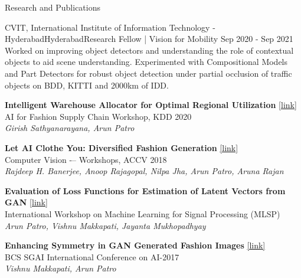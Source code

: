 \documentclass{resume} %
\begin{document}
\begin{rSection}{Research and Publications}
\begin{rSubsection}{CVIT, International Institute of Information Technology - Hyderabad}{Hyderabad}{Research Fellow | Vision for Mobility }{Sep 2020 - Sep 2021}
Worked on improving object detectors and understanding the role of contextual objects to aid scene understanding. Experimented with Compositional Models and Part Detectors for robust object detection under partial occlusion of traffic objects on BDD, KITTI and 2000km of IDD.
\end{rSubsection}

{\bf Intelligent Warehouse Allocator for Optimal Regional Utilization} \href{https://arxiv.org/abs/2007.05081}{[link]}
\\{AI for Fashion Supply Chain Workshop, KDD 2020}
\\{\it Girish Sathyanarayana, Arun Patro}

{\bf Let AI Clothe You: Diversified Fashion Generation}
\href{https://doi.org/10.1007/978-3-030-21074-8_7}{[link]}
\\{Computer Vision -– Workshops, ACCV 2018}
\\{\it Rajdeep H. Banerjee, Anoop Rajagopal, Nilpa Jha, Arun Patro, Aruna Rajan}

\textbf{Evaluation of Loss Functions for Estimation of Latent Vectors from GAN}
\href{https://ieeexplore.ieee.org/abstract/document/8517097}{[link]}
\\{International Workshop on Machine Learning for Signal Processing (MLSP)}
\\{\it Arun Patro, Vishnu Makkapati, Jayanta Mukhopadhyay}

\textbf{Enhancing Symmetry in GAN Generated Fashion Images}
\href{https://doi.org/10.1007/978-3-319-71078-5_34}{[link]}
\\{BCS SGAI International Conference on AI-2017}
\\{\it Vishnu Makkapati, Arun Patro}
\end{rSection}

\end{document}
